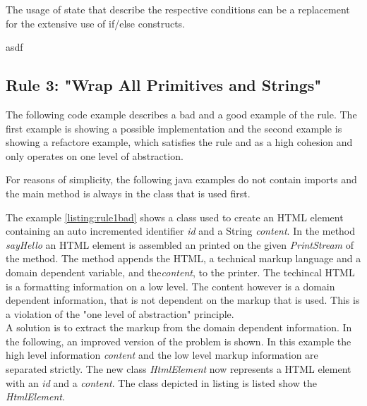 The usage of state that describe the respective conditions can be a replacement for the extensive use of if/else constructs.

















asdf
\subsection{Rule 3: "Wrap All Primitives and Strings"}


The following code example describes a bad and a good example of the rule. The first example is showing a possible implementation and the second example is showing a refactore example, which satisfies the rule and as a high cohesion and only operates on one level of abstraction. 

For reasons of simplicity, the following java examples do not contain imports and the main method is always in the class that is used first. 

%
\label{listing:rule1bad}

The example \ref{listing:rule1bad} shows a class used to create an \acf{HTML} element containing an auto incremented identifier \textit{id} and a String \textit{content}. In the method \textit{sayHello} an \acf{HTML} element is assembled an printed on the given \textit{PrintStream} of the method. The method appends the \acf{HTML}, a technical markup language and a domain dependent variable, and the\textit{content}, to the printer. The techincal \acf{HTML} is a formatting information on a low level. The content however is a domain dependent information, that is not dependent on the markup that is used. This is a violation of the "one level of abstraction" principle.\\

A solution is to extract the markup from the domain dependent information. In the following, an improved version of the problem is shown. In this example the high level information \textit{content} and the low level markup information are separated strictly. The new class \textit{HtmlElement} now represents a \acf{HTML} element with an \textit{id} and a \textit{content}. The class depicted in listing \label{listing:rule1good:element} is listed show the \textit{HtmlElement}. 

